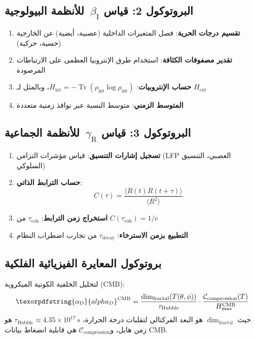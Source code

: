 \documentclass[12pt,a4paper]{article}
\DeclareMathOperator{\Tr}{Tr}
\DeclareRobustCommand{\alD}{\texorpdfstring{\ensuremath{\alpha_{\mathrm{D}}}}{alpha_D}}
\DeclareRobustCommand{\beI}{\texorpdfstring{\ensuremath{\beta_{\mathrm{I}}}}{beta_I}}
\DeclareRobustCommand{\gaR}{\texorpdfstring{\ensuremath{\gamma_{\mathrm{R}}}}{gamma_R}}
\begin{document}
	\subsection{البروتوكول 2: قياس \beI\ للأنظمة البيولوجية}
	
	\begin{enumerate}
		\item \textbf{تقسيم درجات الحرية}: فصل المتغيرات الداخلية (عصبية، أيضية) عن الخارجية (حسية، حركية)
		\item \textbf{تقدير مصفوفات الكثافة}: استخدام طرق الإنتروبيا العظمى على الارتباطات المرصودة
		\item \textbf{حساب الإنتروبيات}: \(H_{\mathrm{int}} = -\Tr(\rho_{\mathrm{int}}\log\rho_{\mathrm{int}})\)، وبالمثل لـ \(H_{\mathrm{ext}}\)
		\item \textbf{المتوسط الزمني}: متوسط النسبة عبر نوافذ زمنية متعددة
	\end{enumerate}
	
	\subsection{البروتوكول 3: قياس \gaR\ للأنظمة الجماعية}
	
	\begin{enumerate}
		\item \textbf{تسجيل إشارات التنسيق}: قياس مؤشرات التزامن (LFP العصبي، التنسيق السلوكي)
		\item \textbf{حساب الترابط الذاتي}:
		\[
		C(\tau) = \frac{\langle R(t)R(t+\tau)\rangle}{\langle R^2\rangle}
		\]
		\item \textbf{استخراج زمن الترابط}: \(\tau_{\mathrm{coh}}\) من \(C(\tau_{\mathrm{coh}}) = 1/e\)
		\item \textbf{التطبيع بزمن الاسترخاء}: \(\tau_{\mathrm{decay}}\) من تجارب اضطراب النظام
	\end{enumerate}
	
	\subsection{بروتوكول المعايرة الفيزيائية الفلكية}
	\label{subsec:astro-calibration}
	
	لتحليل الخلفية الكونية الميكروية (CMB):
	\[
	\alD^{\mathrm{CMB}} = \frac{\dim_{\mathrm{fractal}}(T(\theta,\phi))}{\tau_{\mathrm{Hubble}}} \cdot \frac{\mathcal{C}_{\mathrm{compression}}(T)}{H_{\max}^{\mathrm{CMB}}}
	\]
	حيث \(\dim_{\mathrm{fractal}}\) هو البعد الفركتالي لتقلبات درجة الحرارة، \(\tau_{\mathrm{Hubble}} \approx 4.35 \times 10^{17}\ \mathrm{s}\) هو زمن هابل، و\(\mathcal{C}_{\mathrm{compression}}\) هي قابلية انضغاط بيانات CMB.
	
\end{document}
